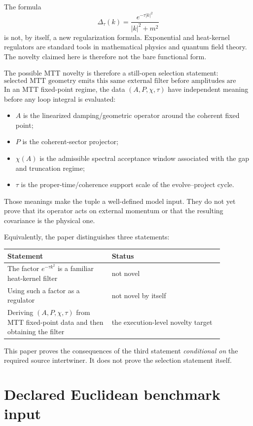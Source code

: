 \documentclass[11pt]{article}
\begin{document}
The formula
\[
        \Delta_\tau(k)=\frac{e^{-\tau |k|^2}}{|k|^2+m^2}
\]
is not, by itself, a new regularization formula. Exponential and heat-kernel regulators are standard tools in mathematical physics and quantum field theory. The novelty claimed here is therefore not the bare functional form.

The possible MTT novelty is therefore a still-open selection statement:
\[
        \boxed{
        \text{selected MTT geometry emits this same external filter before amplitudes are evaluated.}
        }
\]
In an MTT fixed-point regime, the data \((A,P,\chi,\tau)\) have independent meaning before any loop integral is evaluated:
\begin{itemize}
\item \(A\) is the linearized damping/geometric operator around the coherent fixed point;
\item \(P\) is the coherent-sector projector;
\item \(\chi(A)\) is the admissible spectral acceptance window associated with the gap and truncation regime;
\item \(\tau\) is the proper-time/coherence support scale of the evolve--project cycle.
\end{itemize}
Those meanings make the tuple a well-defined model input.  They do not yet prove that its
operator acts on external momentum or that the resulting covariance is the physical one.

Equivalently, the paper distinguishes three statements:
\begin{center}
\begin{tabular}{p{0.42\linewidth}p{0.45\linewidth}}
\toprule
Statement & Status \\
\midrule
The factor \(e^{-\tau k^2}\) is a familiar heat-kernel filter & not novel \\
Using such a factor as a regulator & not novel by itself \\
Deriving \((A,P,\chi,\tau)\) from MTT fixed-point data and then obtaining the filter & the execution-level novelty target \\
\bottomrule
\end{tabular}
\end{center}

This paper proves the consequences of the third statement \emph{conditional on} the required
source intertwiner.  It does not prove the selection statement itself.


\section{Declared Euclidean benchmark input}
\end{document}
